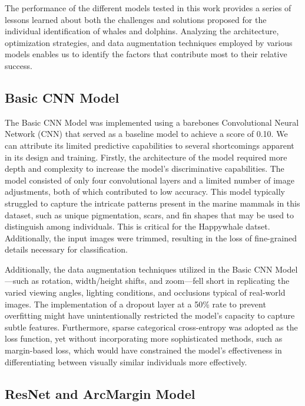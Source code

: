 \documentclass[twocolumn]{article}
\begin{document}
The performance of the different models tested in this work provides a series of lessons learned about both the challenges and solutions proposed for the individual identification of whales and dolphins. Analyzing the architecture, optimization strategies, and data augmentation techniques employed by various models enables us to identify the factors that contribute most to their relative success.

\subsection{Basic CNN Model}

The Basic CNN Model was implemented using a barebones Convolutional Neural Network (CNN) that served as a baseline model to achieve a score of 0.10. We can attribute its limited predictive capabilities to several shortcomings apparent in its design and training. Firstly, the architecture of the model required more depth and complexity to increase the model’s discriminative capabilities. The model consisted of only four convolutional layers and a limited number of image adjustments, both of which contributed to low accuracy. This model typically struggled to capture the intricate patterns present in the marine mammals in this dataset, such as unique pigmentation, scars, and fin shapes that may be used to distinguish among individuals. This is critical for the Happywhale datset. Additionally, the input images were trimmed, resulting in the loss of fine-grained details necessary for classification. 

Additionally, the data augmentation techniques utilized in the Basic CNN Model—such as rotation, width/height shifts, and zoom—fell short in replicating the varied viewing angles, lighting conditions, and occlusions typical of real-world images. The implementation of a dropout layer at a 50\% rate to prevent overfitting might have unintentionally restricted the model’s capacity to capture subtle features. Furthermore, sparse categorical cross-entropy was adopted as the loss function, yet without incorporating more sophisticated methods, such as margin-based loss, which would have constrained the model’s effectiveness in differentiating between visually similar individuals more effectively.

\subsection{ResNet and ArcMargin Model}
\end{document}
